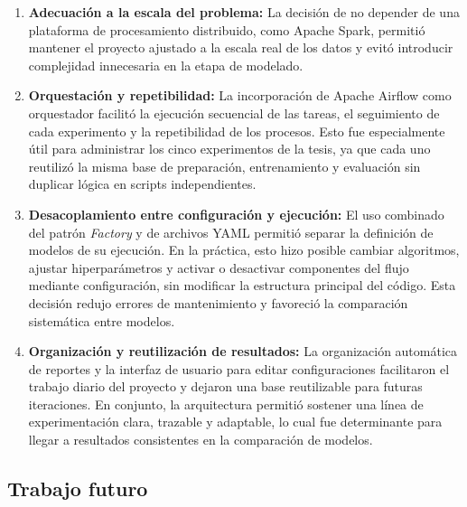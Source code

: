 \begin{enumerate}
    \item \textbf{Adecuación a la escala del problema:} La decisión de no depender de una plataforma de procesamiento distribuido, como Apache Spark, permitió mantener el proyecto ajustado a la escala real de los datos y evitó introducir complejidad innecesaria en la etapa de modelado.

    \item \textbf{Orquestación y repetibilidad:} La incorporación de Apache Airflow como orquestador facilitó la ejecución secuencial de las tareas, el seguimiento de cada experimento y la repetibilidad de los procesos. Esto fue especialmente útil para administrar los cinco experimentos de la tesis, ya que cada uno reutilizó la misma base de preparación, entrenamiento y evaluación sin duplicar lógica en scripts independientes.

    \item \textbf{Desacoplamiento entre configuración y ejecución:} El uso combinado del patrón \textit{Factory} y de archivos YAML permitió separar la definición de modelos de su ejecución. En la práctica, esto hizo posible cambiar algoritmos, ajustar hiperparámetros y activar o desactivar componentes del flujo mediante configuración, sin modificar la estructura principal del código. Esta decisión redujo errores de mantenimiento y favoreció la comparación sistemática entre modelos.

    \item \textbf{Organización y reutilización de resultados:} La organización automática de reportes y la interfaz de usuario para editar configuraciones facilitaron el trabajo diario del proyecto y dejaron una base reutilizable para futuras iteraciones. En conjunto, la arquitectura permitió sostener una línea de experimentación clara, trazable y adaptable, lo cual fue determinante para llegar a resultados consistentes en la comparación de modelos.
\end{enumerate}

\subsection{Trabajo futuro}

